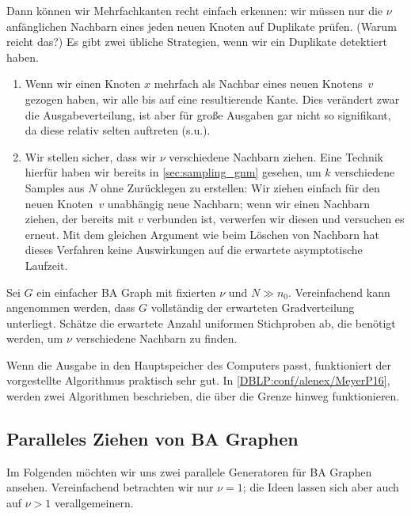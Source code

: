Dann können wir Mehrfachkanten recht einfach erkennen:
wir müssen nur die $\nu$ anfänglichen Nachbarn eines jeden neuen Knoten auf Duplikate prüfen.
(Warum reicht das?)
Es gibt zwei übliche Strategien, wenn wir ein Duplikate detektiert haben.

\begin{enumerate}
    \item Wenn wir einen Knoten $x$ mehrfach als Nachbar eines neuen Knotens~$v$ gezogen haben,  wir alle bis auf eine resultierende Kante.
          Dies verändert zwar die Ausgabeverteilung, ist aber für große Ausgaben gar nicht so signifikant, da diese relativ selten auftreten (s.u.).

    \item Wir stellen sicher, dass wir $\nu$ verschiedene Nachbarn ziehen.
          Eine Technik hierfür haben wir bereits in \cref{sec:sampling_gnm} gesehen, um $k$ verschiedene Samples aus $N$ ohne Zurücklegen zu erstellen:
          Wir ziehen einfach für den neuen Knoten~$v$ unabhängig neue Nachbarn;
          wenn wir einen Nachbarn ziehen, der bereits mit $v$ verbunden ist, verwerfen wir diesen und versuchen es erneut.
          Mit dem gleichen Argument wie beim Löschen von Nachbarn hat dieses Verfahren keine Auswirkungen auf die erwartete asymptotische Laufzeit.

\end{enumerate}

\begin{exercise}
    Sei $G$ ein einfacher BA Graph mit fixierten $\nu$ und $N \gg n_0$.
    Vereinfachend kann angenommen werden, dass $G$ vollständig der erwarteten Gradverteilung unterliegt.
    Schätze die erwartete Anzahl uniformen Stichproben ab, die benötigt werden, um $\nu$ verschiedene Nachbarn zu finden.
\end{exercise}

Wenn die Ausgabe in den Hauptspeicher des Computers passt, funktioniert der vorgestellte Algorithmus praktisch sehr gut.
In \cref{DBLP:conf/alenex/MeyerP16}, werden zwei Algorithmen beschrieben, die über die Grenze hinweg funktionieren.

\subsection{Paralleles Ziehen von BA Graphen}
Im Folgenden möchten wir uns zwei parallele Generatoren für BA Graphen ansehen.
Vereinfachend betrachten wir nur $\nu = 1$; die Ideen lassen sich aber auch auf $\nu > 1$ verallgemeinern.

